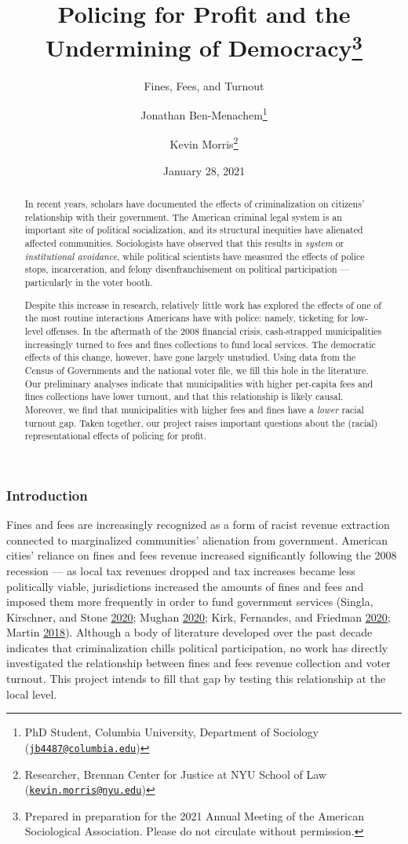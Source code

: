 \documentclass[
  12pt,
]{article}
\title{Policing for Profit and the Undermining of Democracy\thanks{Prepared in preparation for the 2021 Annual Meeting of the American Sociological Association. Please do not circulate without permission.}}
\subtitle{Fines, Fees, and Turnout}
\author{Jonathan Ben-Menachem\footnote{PhD Student, Columbia University, Department of Sociology (\href{mailto:jb4487@columbia.edu}{\nolinkurl{jb4487@columbia.edu}})} \and Kevin Morris\footnote{Researcher, Brennan Center for Justice at NYU School of Law (\href{mailto:kevin.morris@nyu.edu}{\nolinkurl{kevin.morris@nyu.edu}})}}
\date{January 28, 2021}
\begin{document}
\maketitle
\begin{abstract}
In recent years, scholars have documented the effects of criminalization on citizens' relationship with their government. The American criminal legal system is an important site of political socialization, and its structural inequities have alienated affected communities. Sociologists have observed that this results in \emph{system} or \emph{institutional avoidance}, while political scientists have measured the effects of police stops, incarceration, and felony disenfranchisement on political participation --- particularly in the voter booth.

Despite this increase in research, relatively little work has explored the effects of one of the most routine interactions Americans have with police: namely, ticketing for low-level offenses. In the aftermath of the 2008 financial crisis, cash-strapped municipalities increasingly turned to fees and fines collections to fund local services. The democratic effects of this change, however, have gone largely unstudied. Using data from the Census of Governments and the national voter file, we fill this hole in the literature. Our preliminary analyses indicate that municipalities with higher per-capita fees and fines collections have lower turnout, and that this relationship is likely causal. Moreover, we find that municipalities with higher fees and fines have a \emph{lower} racial turnout gap. Taken together, our project raises important questions about the (racial) representational effects of policing for profit.
\end{abstract}

\pagebreak


\hypertarget{introduction}{%
\subsubsection*{Introduction}\label{introduction}}

Fines and fees are increasingly recognized as a form of racist revenue extraction connected to marginalized communities' alienation from government. American cities' reliance on fines and fees revenue increased significantly following the 2008 recession --- as local tax revenues dropped and tax increases became less politically viable, jurisdictions increased the amounts of fines and fees and imposed them more frequently in order to fund government services (Singla, Kirschner, and Stone \protect\hyperlink{ref-Singla2020}{2020}; Mughan \protect\hyperlink{ref-Mughan2020}{2020}; Kirk, Fernandes, and Friedman \protect\hyperlink{ref-Kirk2020}{2020}; Martin \protect\hyperlink{ref-Martin2018}{2018}). Although a body of literature developed over the past decade indicates that criminalization chills political participation, no work has directly investigated the relationship between fines and fees revenue collection and voter turnout. This project intends to fill that gap by testing this relationship at the local level.
\end{document}
